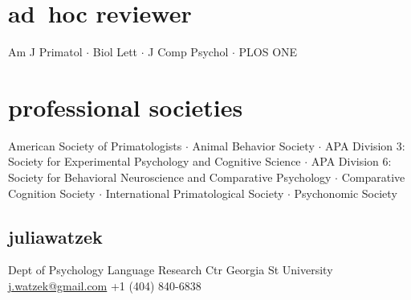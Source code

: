 \documentclass[]{friggeri-cv}
\begin{document}

\section{ad~hoc reviewer}
    Am J Primatol $\cdot$ Biol Lett $\cdot$ J Comp Psychol $\cdot$ PLOS ONE \\[.5cm]



\section{professional societies}
    American Society of Primatologists $\cdot$ %
    Animal Behavior Society $\cdot$ %
    APA Division 3: Society for Experimental Psychology and Cognitive Science $\cdot$ %
    APA Division 6: Society for Behavioral Neuroscience and Comparative Psychology $\cdot$ %
    Comparative Cognition Society $\cdot$ %
    International Primatological Society $\cdot$ %
    Psychonomic Society \\[.5cm]%



\newpage

\begin{aside}
  \section{{\normalfont julia}watzek}
    Dept of Psychology
    Language Research Ctr
    Georgia St University
    ~
    \href{mailto:j.watzek@gmail.com}{j.watzek@gmail.com}
    +1 (404) 840-6838
\end{aside}


\end{document}
